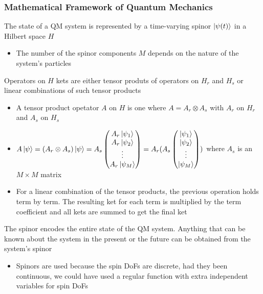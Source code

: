 \documentclass[8pt,t,mathserif,aspectratio=169]{beamer}
\begin{document}
 \begin{frame}
   \frametitle{Mathematical Framework of Quantum Mechanics}
   \vspace{1mm}
   The state of a QM system is represented by a time-varying spinor $\ket{\psi(t)}$ in a Hilbert space $H$
   \begin{itemize}
     \item The number of the spinor components $M$ depends on the nature of the system's particles
   \end{itemize}  
   Operators on $H$ kets are either tensor produts of operators on $H_r$ and $H_s$ or linear combinations of such tensor products
   \begin{itemize}
     \item A tensor product opetator $A$ on $H$ is one where $A = A_r \otimes A_s$ with $A_r$ on $H_r$ and $A_s$ on $H_s$
     \item $A \ket{\psi} = (A_r \otimes A_s) \ket{\psi} = A_s \begin{pmatrix} A_r \ket{\psi_1} \\ A_r \ket{\psi_2} \\ \vdots \\ A_r \ket{\psi_M} \end{pmatrix} = A_r (A_s \begin{pmatrix} \ket{\psi_1} \\ \ket{\psi_2} \\ \vdots \\ \ket{\psi_M} \end{pmatrix})$ where $A_s$ is an $M \times M$ matrix
     \item For a linear combination of the tensor products, the previous operation holds term by term. The resulting ket for each term is multiplied by the term coefficient and all kets are summed to get the final ket
   \end{itemize}
   The spinor encodes the entire state of the QM system. Anything that can be known about the system in the present or the future can be obtained from the system's spinor
   \begin{itemize}
     \item Spinors are used because the spin DoFs are discrete, had they been continuous, we could have used a regular function with extra independent variables for spin DoFs 
   \end{itemize}
 \end{frame}
\end{document}
